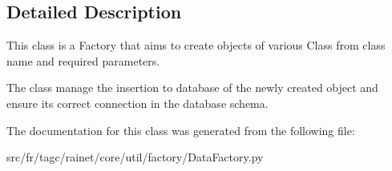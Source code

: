 \subsection{Detailed Description}
This class is a Factory that aims to create objects of various Class from class name and required parameters. 

The class manage the insertion to database of the newly created object and ensure its correct connection in the database schema. 

The documentation for this class was generated from the following file\+:\begin{DoxyCompactItemize}
\item 
src/fr/tagc/rainet/core/util/factory/Data\+Factory.\+py\end{DoxyCompactItemize}
